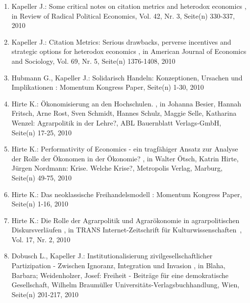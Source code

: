 \begin{enumerate}[leftmargin=*, labelsep=0.5cm]
	 \item Kapeller J.:  Some critical notes on citation metrics and heterodox economics  , in Review of Radical Political Economics, Vol. 42, Nr. 3, Seite(n) 330-337, 2010
	 \item Kapeller J.:  Citation Metrics: Serious drawbacks, perverse incentives and strategic options for heterodox economics  , in American Journal of Economics and Sociology, Vol. 69, Nr. 5, Seite(n) 1376-1408, 2010
	 \item Hubmann G., Kapeller J.:  Solidarisch Handeln: Konzeptionen, Ursachen und Implikationen  : Momentum Kongress Paper, Seite(n) 1-30, 2010
	 \item Hirte K.:  Ökonomisierung an den Hochschulen.  , in Johanna Besier, Hannah Fritsch, Arne Rost, Sven Schmidt, Hannes Schulz, Maggie Selle, Katharina Wenzel: Agrarpolitik in der Lehre?, ABL Bauernblatt Verlags-GmbH, Seite(n) 17-25, 2010
	 \item Hirte K.:  Performativity of Economics - ein tragfähiger Ansatz zur Analyse der Rolle der Ökonomen in der Ökonomie?  , in Walter Ötsch, Katrin Hirte, Jürgen Nordmann: Krise. Welche Krise?, Metropolis Verlag, Marburg, Seite(n) 49-75, 2010
	 \item Hirte K.:  Das neoklassische Freihandelsmodell  : Momentum Kongress Paper, Seite(n) 1-16, 2010
	 \item Hirte K.:  Die Rolle der Agrarpolitik und Agrarökonomie in agrarpolitischen Diskursverläufen  , in TRANS Internet-Zeitschrift für Kulturwissenschaften , Vol. 17, Nr. 2, 2010
	 \item Dobusch L., Kapeller J.:  Institutionalisierung zivilgesellschaftlicher Partizipation - Zwischen Ignoranz, Integration und Invasion  , in Blaha, Barbara; Weidenholzer, Josef: Freiheit - Beiträge für eine demokratische Gesellschaft, Wilhelm Braumüller Universitäts-Verlagsbuchhandlung, Wien, Seite(n) 201-217, 2010
\end{enumerate} 
